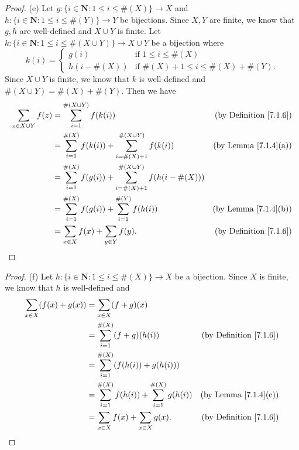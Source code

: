 \begin{proof}{(e)}
    Let \(g : \{i \in \mathbf{N} : 1 \leq i \leq \#(X)\} \to X\) and \(h : \{i \in \mathbf{N} : 1 \leq i \leq \#(Y)\} \to Y\) be bijections.
    Since \(X, Y\) are finite, we know that \(g, h\) are well-defined and \(X \cup Y\) is finite.
    Let \(k : \{i \in \mathbf{N} : 1 \leq i \leq \#(X \cup Y)\} \to X \cup Y\) be a bijection where
    \[
        k(i) = \begin{cases}
            g(i)         & \text{if } 1 \leq i \leq \#(X)                  \\
            h(i - \#(X)) & \text{if } \#(X) + 1 \leq i \leq \#(X) + \#(Y).
        \end{cases}
    \]
    Since \(X \cup Y\) is finite, we know that \(k\) is well-defined and \(\#(X \cup Y) = \#(X) + \#(Y)\).
    Then we have
    \begin{align*}
        \sum_{z \in X \cup Y} f(z) & = \sum_{i = 1}^{\#(X \cup Y)} f(k(i))                                                & \text{(by Definition \ref{7.1.6})} \\
                                   & = \sum_{i = 1}^{\#(X)} f(k(i)) + \sum_{i = \#(X) + 1}^{\#(X \cup Y)} f(k(i))         & \text{(by Lemma \ref{7.1.4}(a))}   \\
                                   & = \sum_{i = 1}^{\#(X)} f(g(i)) + \sum_{i = \#(X) + 1}^{\#(X \cup Y)} f(h(i - \#(X)))                                      \\
                                   & = \sum_{i = 1}^{\#(X)} f(g(i)) + \sum_{i = 1}^{\#(Y)} f(h(i))                        & \text{(by Lemma \ref{7.1.4}(b))}   \\
                                   & = \sum_{x \in X} f(x) + \sum_{y \in Y} f(y).                                         & \text{(by Definition \ref{7.1.6})}
    \end{align*}
\end{proof}

\begin{proof}{(f)}
    Let \(h : \{i \in \mathbf{N} : 1 \leq i \leq \#(X)\} \to X\) be a bijection.
    Since \(X\) is finite, we know that \(h\) is well-defined and
    \begin{align*}
        \sum_{x \in X} (f(x) + g(x)) & = \sum_{x \in X} (f + g)(x)                                                                        \\
                                     & = \sum_{i = 1}^{\#(X)} (f + g)(h(i))                          & \text{(by Definition \ref{7.1.6})} \\
                                     & = \sum_{i = 1}^{\#(X)} (f(h(i)) + g(h(i)))                                                         \\
                                     & = \sum_{i = 1}^{\#(X)} f(h(i)) + \sum_{i = 1}^{\#(X)} g(h(i)) & \text{(by Lemma \ref{7.1.4}(c))}   \\
                                     & = \sum_{x \in X} f(x) + \sum_{x \in X} g(x).                  & \text{(by Definition \ref{7.1.6})}
    \end{align*}
\end{proof}

